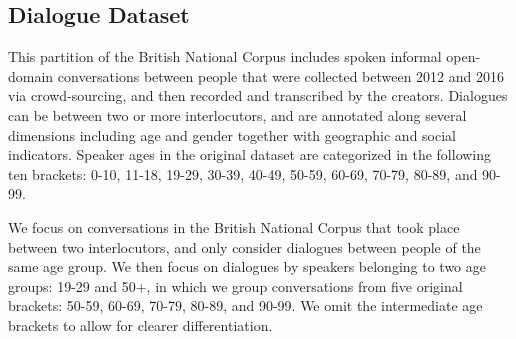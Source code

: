 \begin{table*}[h]
    \caption{Descriptive statistics of the datasets used in our experiments. {Length} is the number of tokens in a sample.}

    
    \label{tab:summary_corpora}
\end{table*}

\subsection{Dialogue Dataset}\label{sec:datadialogue}
\label{subsec:dialogue_dataset}


This partition of the British National Corpus includes spoken informal open-domain conversations between people that were collected between 2012 and 2016 via crowd-sourcing, and then recorded and transcribed by the creators. Dialogues can be between two or more interlocutors, and are annotated
along several dimensions including age and gender together with geographic and social indicators. Speaker ages in the original dataset are categorized in the following ten brackets: 0-10, 11-18, 19-29, 30-39, 40-49, 50-59, 60-69, 70-79, 80-89, and 90-99.


We focus on conversations in the British National Corpus that took place between two interlocutors,
and only consider dialogues
between people of the same age group. 
We then focus on dialogues by speakers belonging to two age groups: 19-29 and 50+, in which we group conversations from five original brackets: 50-59, 60-69, 70-79, 80-89, and 90-99.
We omit the intermediate age brackets to allow for clearer differentiation.

